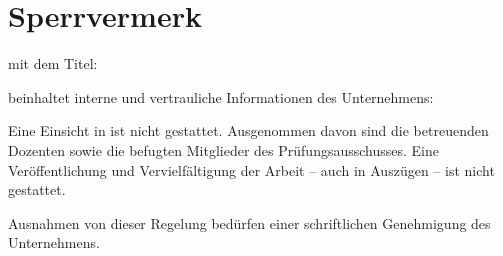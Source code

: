 \chapter*{Sperrvermerk}
\vspace*{0.7cm}

 mit dem Titel:
\vspace*{0.7cm}

\titel


\vspace*{0.7cm}
beinhaltet interne und vertrauliche Informationen des Unternehmens:
\vspace*{0.7cm}

\institutioneins

\vspace*{0.7cm}
Eine Einsicht in
ist nicht gestattet. Ausgenommen davon sind die betreuenden Dozenten sowie die befugten Mitglieder des Prüfungsausschusses. Eine Veröffentlichung und Vervielfältigung der Arbeit – auch in Auszügen – ist nicht gestattet.

\vspace*{0.7cm}

Ausnahmen von dieser Regelung bedürfen einer schriftlichen Genehmigung des Unternehmens.

\clearpage
\rohead{\textnormal{\headmark}}
